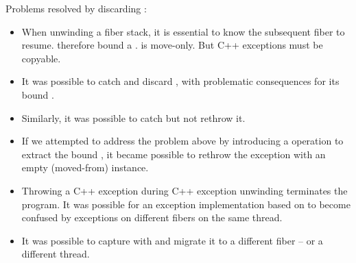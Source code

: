 Problems resolved by discarding \unwindex:
\begin{itemize}
    \item When unwinding a fiber stack, it is essential to know the subsequent
          fiber to resume. \unwindex therefore bound a \fiber. \fiber is
          move-only. But C++ exceptions must be copyable.
    \item It was possible to catch and discard \unwindex, with problematic
          consequences for its bound \fiber.
    \item Similarly, it was possible to catch \unwindex but not rethrow it.
    \item If we attempted to address the problem above by introducing a
          \unwindex operation to extract the bound \fiber, it became possible
          to rethrow the exception with an empty (moved-from) \fiber instance.
    \item Throwing a C++ exception during C++ exception unwinding terminates
          the program. It was possible for an exception implementation based
          on  to become confused by exceptions on different
          fibers on the same thread.
    \item It was possible to capture \unwindex with 
          and migrate it to a different fiber -- or a different thread.
\end{itemize}

